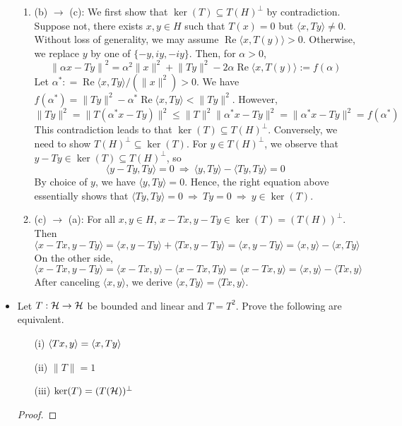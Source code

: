 \begin{itemize}
\begin{enumerate}[$\bullet$]
		\item (b) $\rightarrow$ (c): We first show that $\ker(T)\subseteq T(H)^\perp$ by contradiction. 
		Suppose not, there exists $x,y\in H$ such that $T(x)=0$ but $\langle x, Ty\rangle \neq 0$. Without loss of generality, we may assume $\operatorname{Re}\langle x, T(y)\rangle >0$. Otherwise, we replace $y$ by one of $\{-y, iy, -iy\}$. Then, for $\alpha > 0$,
		$$
		 \left\lVert \alpha x-Ty\right\rVert^2 = \alpha^2\lVert x\rVert^2 + \lVert Ty\rVert^2 -2\alpha\operatorname{Re}\langle x, T(y)\rangle:=f(\alpha)
		$$
		Let $\alpha^*: = \operatorname{Re}\langle x, Ty\rangle/(\lVert x\rVert^2)>0$. We have $f(\alpha^*) = \lVert Ty\rVert^2 - \alpha^* \operatorname{Re}\langle x,Ty\rangle < \lVert Ty\rVert^2$. However,
		$$
		 \lVert Ty\rVert^2  = \lVert T(\alpha^*x-Ty)\rVert^2 \le \lVert T\rVert^2\lVert \alpha^*x-Ty\rVert^2 = \lVert \alpha^*x-Ty\rVert^2 = f(\alpha^*)
		$$
		This contradiction leads to that $\ker(T)\subseteq T(H)^\perp$. Conversely, we need to show $T(H)^\perp\subseteq \ker(T)$. For $y\in T(H)^\perp$, we observe that $y-Ty\in \operatorname{ker}(T)\subseteq T(H)^\perp$, so
		$$
		\langle y-Ty, Ty\rangle =0 ~\Rightarrow~ \langle y, Ty\rangle - \langle Ty, Ty\rangle = 0
		$$
		By choice of $y$, we have $\langle y, Ty\rangle =0$. Hence, the right equation above essentially shows that $\langle Ty,Ty\rangle = 0~\Rightarrow~Ty=0~\Rightarrow~y\in \ker(T)$.
		\item (c) $\rightarrow$ (a): For all $x,y\in H$, $x-Tx, y-Ty\in \operatorname{ker}(T)=(T(H))^\perp$. Then
		$$
		\langle x-Tx, y-Ty\rangle = \langle x, y-Ty\rangle + \langle Tx, y-Ty\rangle = \langle x, y-Ty\rangle = \langle x, y\rangle - \langle x, Ty\rangle
		$$
		On the other side,
		$$
		\langle x-Tx, y-Ty\rangle = \langle x-Tx, y\rangle -\langle x-Tx, Ty\rangle = \langle x-Tx, y\rangle = \langle x, y\rangle -\langle Tx, y\rangle
		$$
		After canceling $\langle x,y\rangle$, we derive $\langle x, Ty\rangle = \langle Tx, y\rangle$.
	\end{enumerate}
\iffalse
\item Let $T : \mathcal{H} \to \mathcal{H}$ be bounded and linear and $T=T^2$. Prove the following are equivalent.
	\begin{itemize}
		\item[(i)] $\langle Tx,y\rangle = \langle x,Ty\rangle$
		\item[(ii)] $\|T\|=1$
		\item[(iii)] $\ker(T)=(T(\mathcal{H}))^\perp$
	\end{itemize}
\begin{proof}

\end{proof}
\end{itemize}
